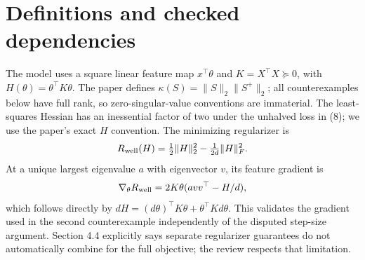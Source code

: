\documentclass[10pt]{article}
\begin{document}
\section*{Definitions and checked dependencies}
The model uses a square linear feature map \(x^\top\theta\) and \(K=X^\top X\succeq0\), with \(H(\theta)=\theta^\top K\theta\). The paper defines \(\kappa(S)=\|S\|_2\|S^+\|_2\); all counterexamples below have full rank, so zero-singular-value conventions are immaterial. The least-squares Hessian has an inessential factor of two under the unhalved loss in (8); we use the paper’s exact \(H\) convention. The minimizing regularizer is \[R_{\rm well}(H)=\tfrac12\|H\|_2^2-\tfrac1{2d}\|H\|_F^2.\] At a unique largest eigenvalue \(a\) with eigenvector \(v\), its feature gradient is \[\nabla_\theta R_{\rm well}=2K\theta(avv^\top-H/d),\] which follows directly by \(dH=(d\theta)^\top K\theta+\theta^\top Kd\theta\). This validates the gradient used in the second counterexample independently of the disputed step-size argument. Section 4.4 explicitly says separate regularizer guarantees do not automatically combine for the full objective; the review respects that limitation.\par
\end{document}
